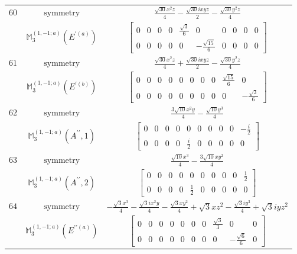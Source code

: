 \documentclass[fleqn,8pt,landscape]{jsarticle}
\begin{document}
\begin{longtable}{ccc}
$ 60 $ & $ \text{symmetry} $ & $ \frac{\sqrt{30} x^{2} z}{4} - \frac{\sqrt{30} i x y z}{2} - \frac{\sqrt{30} y^{2} z}{4} $ \\
$  $ & $ \mathbb{M}_{3}^{(1,-1;a)}(E^{\prime(a)}) $ & $ \begin{bmatrix} 0 & 0 & 0 & 0 & \frac{\sqrt{3}}{6} & 0 & 0 & 0 & 0 & 0 \\ 0 & 0 & 0 & 0 & 0 & - \frac{\sqrt{15}}{6} & 0 & 0 & 0 & 0 \end{bmatrix} $ \\ \hline
$ 61 $ & $ \text{symmetry} $ & $ \frac{\sqrt{30} x^{2} z}{4} + \frac{\sqrt{30} i x y z}{2} - \frac{\sqrt{30} y^{2} z}{4} $ \\
$  $ & $ \mathbb{M}_{3}^{(1,-1;a)}(E^{\prime(b)}) $ & $ \begin{bmatrix} 0 & 0 & 0 & 0 & 0 & 0 & 0 & 0 & \frac{\sqrt{15}}{6} & 0 \\ 0 & 0 & 0 & 0 & 0 & 0 & 0 & 0 & 0 & - \frac{\sqrt{3}}{6} \end{bmatrix} $ \\ \hline
$ 62 $ & $ \text{symmetry} $ & $ \frac{3 \sqrt{10} x^{2} y}{4} - \frac{\sqrt{10} y^{3}}{4} $ \\
$  $ & $ \mathbb{M}_{3}^{(1,-1;a)}(A^{\prime\prime},1) $ & $ \begin{bmatrix} 0 & 0 & 0 & 0 & 0 & 0 & 0 & 0 & 0 & - \frac{i}{2} \\ 0 & 0 & 0 & 0 & \frac{i}{2} & 0 & 0 & 0 & 0 & 0 \end{bmatrix} $ \\ \hline
$ 63 $ & $ \text{symmetry} $ & $ \frac{\sqrt{10} x^{3}}{4} - \frac{3 \sqrt{10} x y^{2}}{4} $ \\
$  $ & $ \mathbb{M}_{3}^{(1,-1;a)}(A^{\prime\prime},2) $ & $ \begin{bmatrix} 0 & 0 & 0 & 0 & 0 & 0 & 0 & 0 & 0 & \frac{1}{2} \\ 0 & 0 & 0 & 0 & \frac{1}{2} & 0 & 0 & 0 & 0 & 0 \end{bmatrix} $ \\ \hline
$ 64 $ & $ \text{symmetry} $ & $ - \frac{\sqrt{3} x^{3}}{4} - \frac{\sqrt{3} i x^{2} y}{4} - \frac{\sqrt{3} x y^{2}}{4} + \sqrt{3} x z^{2} - \frac{\sqrt{3} i y^{3}}{4} + \sqrt{3} i y z^{2} $ \\
$  $ & $ \mathbb{M}_{3}^{(1,-1;a)}(E^{\prime\prime(a)}) $ & $ \begin{bmatrix} 0 & 0 & 0 & 0 & 0 & 0 & 0 & \frac{\sqrt{3}}{3} & 0 & 0 \\ 0 & 0 & 0 & 0 & 0 & 0 & 0 & 0 & - \frac{\sqrt{6}}{6} & 0 \end{bmatrix} $ \\ \hline

\end{longtable}
\end{document}
